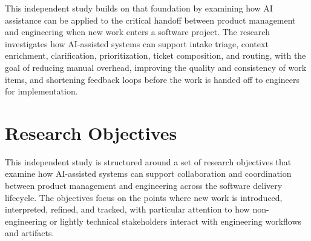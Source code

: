 \documentclass[11pt]{article}
\begin{document}
This independent study builds on that foundation by examining how AI assistance can be applied to the critical handoff between product management and engineering when new work enters a software project. The research investigates how AI-assisted systems can support intake triage, context enrichment, clarification, prioritization, ticket composition, and routing, with the goal of reducing manual overhead, improving the quality and consistency of work items, and shortening feedback loops before the work is handed off to engineers for implementation.

\section*{Research Objectives}

This independent study is structured around a set of research objectives that examine how AI-assisted systems can support collaboration and coordination between product management and engineering across the software delivery lifecycle. The objectives focus on the points where new work is introduced, interpreted, refined, and tracked, with particular attention to how non-engineering or lightly technical stakeholders interact with engineering workflows and artifacts.
\end{document}

